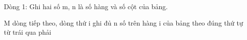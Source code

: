 Dòng 1: Ghi hai số m, n là số hàng và số cột của bảng.  

   M dòng tiếp theo, dòng thứ i ghi đủ n số trên hàng i của bảng theo đúng thứ tự từ trái qua phải  

\